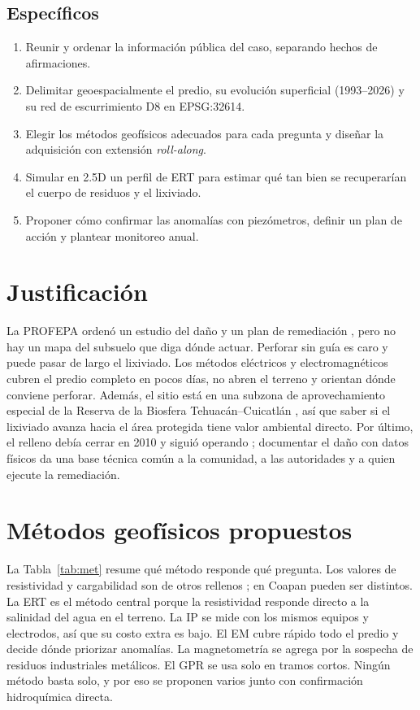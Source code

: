 \subsection{Específicos}
\begin{enumerate}
\item Reunir y ordenar la información pública del caso, separando hechos de afirmaciones.
\item Delimitar geoespacialmente el predio, su evolución superficial (1993--2026) y su red de escurrimiento D8 en EPSG:32614.
\item Elegir los métodos geofísicos adecuados para cada pregunta y diseñar la adquisición con extensión \emph{roll-along}.
\item Simular en 2.5D un perfil de ERT para estimar qué tan bien se recuperarían el cuerpo de residuos y el lixiviado.
\item Proponer cómo confirmar las anomalías con piezómetros, definir un plan de acción y plantear monitoreo anual.
\end{enumerate}

\section{Justificación}
La PROFEPA ordenó un estudio del daño y un plan de remediación \cite{greenpeace,profepa}, pero no hay un mapa del subsuelo que diga dónde actuar. Perforar sin guía es caro y puede pasar de largo el lixiviado. Los métodos eléctricos y electromagnéticos cubren el predio completo en pocos días, no abren el terreno y orientan dónde conviene perforar. Además, el sitio está en una subzona de aprovechamiento especial de la Reserva de la Biosfera Tehuacán--Cuicatlán \cite{publimetro,conanp}, así que saber si el lixiviado avanza hacia el área protegida tiene valor ambiental directo. Por último, el relleno debía cerrar en 2010 y siguió operando \cite{linares}; documentar el daño con datos físicos da una base técnica común a la comunidad, a las autoridades y a quien ejecute la remediación.

\section{Métodos geofísicos propuestos}
La Tabla~\ref{tab:met} resume qué método responde qué pregunta. Los valores de resistividad y cargabilidad son de otros rellenos \cite{abdulrahman2016,rawfill}; en Coapan pueden ser distintos. La ERT es el método central porque la resistividad responde directo a la salinidad del agua en el terreno. La IP se mide con los mismos equipos y electrodos, así que su costo extra es bajo. El EM cubre rápido todo el predio y decide dónde priorizar anomalías. La magnetometría se agrega por la sospecha de residuos industriales metálicos. El GPR se usa solo en tramos cortos. Ningún método basta solo, y por eso se proponen varios junto con confirmación hidroquímica directa.

